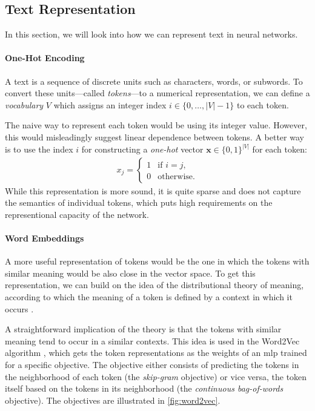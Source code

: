 {\subsection{Text Representation}
\label{sec:text-repr}
In this section, we will look into how we can represent text in neural networks.


\paragraph{One-Hot Encoding}
A text is a sequence of discrete units such as characters, words, or subwords. To convert these units---called \textit{tokens}---to a numerical representation, we can define a \textit{vocabulary} $V$ which assigns an integer index $i \in \{0, \ldots, |V|-1\}$ to each token.

The naive way to represent each token would be using its integer value. However, this would misleadingly suggest linear dependence between tokens. A better way is to use the index $i$ for constructing a \textit{one-hot} vector $\mathbf{x} \in \{0,1\}^{|V|} $ for each token:
\begin{align}
    x_j = \begin{cases}
        1 & \text{if } i = j, \\
        0 & \text{otherwise}.
    \end{cases}
\end{align}
While this representation is more sound, it is quite sparse and does not capture the semantics of individual tokens, which puts high requirements on the representional capacity of the network.

\paragraph{Word Embeddings} A more useful representation of tokens would be the one in which the tokens with similar meaning would be also close in the vector space. To get this representation, we can build on the idea of the distributional theory of meaning, according to which the meaning of a token is defined by a context in which it occurs \cite{harris1954distributional,firth1957synopsis}.

A straightforward implication of the theory is that the tokens with similar meaning tend to occur in a similar contexts. This idea is used in the Word2Vec algorithm \cite{mikolov2013distributed}, which gets the token representations as the weights of an \ac{mlp} trained for a specific objective. The objective either consists of predicting the tokens in the neighborhood of each token (the \emph{skip-gram} objective) or vice versa, the token itself based on the tokens in its neighborhood (the \emph{continuous bag-of-words} objective).  The objectives are illustrated in \autoref{fig:word2vec}.

}
